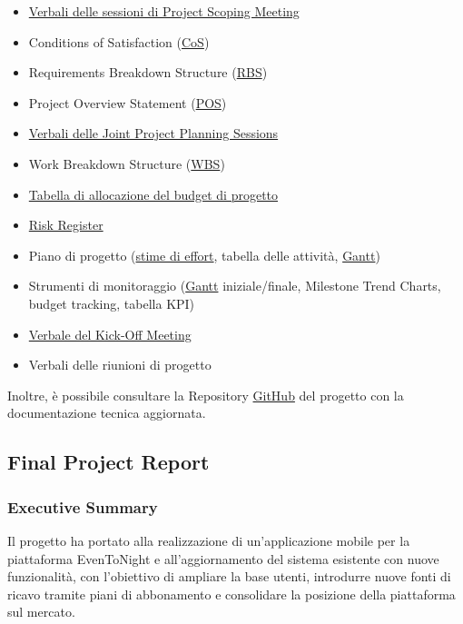 \documentclass[11pt,a4paper]{article}
\providecommand{\tightlist}{\setlength{\itemsep}{0pt}\setlength{\parskip}{0pt}}
\begin{document}
\begin{itemize}
\tightlist
\item
  \hyperref[h.rzay4rjovui3]{Verbali delle sessioni di Project Scoping Meeting}
\item
  {Conditions of Satisfaction (\hyperref[sec:cos]{CoS})}
\item
  {Requirements Breakdown Structure (\hyperref[sec:rbs]{RBS})}
\item
  {Project Overview Statement (\hyperref[sec:pos]{POS})}
\item
  \hyperref[h.gyro4eqy7esg]{Verbali delle Joint Project Planning Sessions}
\item
  {Work Breakdown Structure (\hyperref[sec:wbs]{WBS})}
\item
  {\hyperref[sec:budget]{Tabella di allocazione del budget di progetto}}
\item
  {\hyperref[sec:risk]{Risk Register}}
\item
  {Piano di progetto (\hyperref[sec:stime]{stime di effort}, tabella delle attività, \hyperref[sec:gantt]{Gantt})}
\item
  {Strumenti di monitoraggio (\hyperref[sec:gantt]{Gantt} iniziale/finale, Milestone Trend Charts, budget tracking, tabella KPI)}
\item
  \hyperref[sec:launching]{Verbale del Kick-Off Meeting}
\item
  {Verbali delle riunioni di progetto }
\end{itemize}

{}

{Inoltre, è possibile consultare la Repository \href{https://github.com/EvenToNight/EvenToNight}{GitHub} del progetto con la documentazione tecnica aggiornata.}

\subsection{\texorpdfstring{{Final Project Report}}{Final Project Report}}\label{h.imyeo3ae9fw6}

\subsubsection*{Executive Summary}

{Il progetto ha portato alla realizzazione di un’applicazione mobile per la piattaforma EvenToNight e all’aggiornamento del sistema esistente con nuove funzionalità, con l’obiettivo di ampliare la base utenti, introdurre nuove fonti di ricavo tramite piani di abbonamento e consolidare la posizione della piattaforma sul mercato.}
\end{document}
